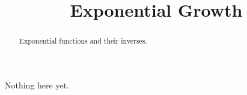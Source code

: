 \documentclass{ximera}
\title{Exponential Growth}
\begin{document}
\begin{abstract}
Exponential functions and their inverses.
\end{abstract}
\maketitle

Nothing here yet.
\end{document}
